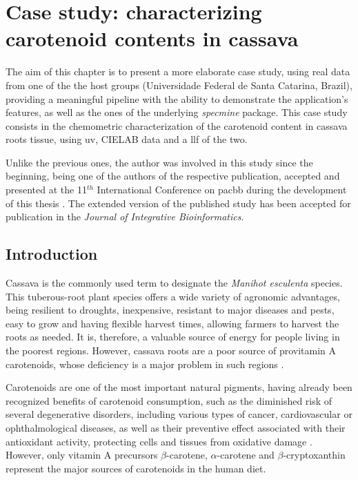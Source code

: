 
\chapter{Case study: characterizing carotenoid contents in cassava} \label{case_study}

The aim of this chapter is to present a more elaborate case study, using real data from one of the the host groups (Universidade Federal de Santa Catarina, Brazil), providing a meaningful pipeline with the ability to demonstrate the application's features, as well as the ones of the underlying \textit{specmine} package. This case study consists in the chemometric characterization of the carotenoid content in cassava roots tissue, using \gls{uv}, CIELAB data and a \acrfull{llf} of the two.

Unlike the previous ones, the author was involved in this study since the beginning, being one of the authors of the respective publication, accepted and presented at the 11$^{th}$ International Conference on \gls{pacbb} during the development of this thesis \citep{moresco2017classification}. The extended version of the published study has been accepted for publication in the \textit{Journal of Integrative Bioinformatics}.


\section{Introduction}

Cassava is the commonly used term to designate the \textit{Manihot esculenta} species. This tuberous-root plant species offers a wide variety of agronomic advantages, being resilient to droughts, inexpensive, resistant to major diseases and pests, easy to grow and having flexible harvest times, allowing farmers to harvest the roots as needed. It is, therefore, a valuable source of energy for people living in the poorest regions. However, cassava roots are a poor source of provitamin A carotenoids, whose deficiency is a major problem in such regions \citep{la2013biofortified, sanchez2014prediction}. 

Carotenoids are one of the most important natural pigments, having already been recognized benefits of carotenoid consumption, such as the diminished risk of several degenerative disorders, including various types of cancer, cardiovascular or ophthalmological diseases, as well as their preventive effect associated with their antioxidant activity, protecting cells and tissues from oxidative damage \citep{stahl2003antioxidant}. However, only vitamin A precursors $\beta$-carotene, $\alpha$-carotene and $\beta$-cryptoxanthin represent the major sources of carotenoids in the human diet.

